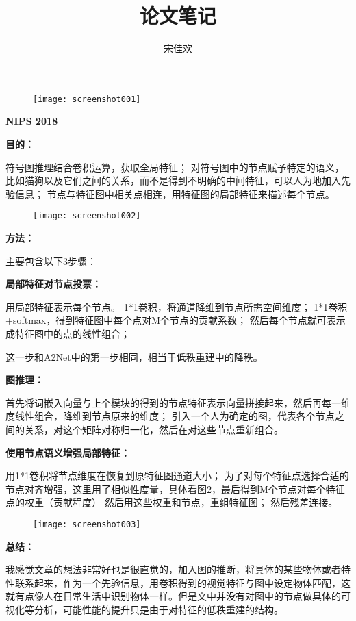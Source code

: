 \documentclass[UTF8]{ctexart} %
\title{论文笔记}
\author{宋佳欢}
\begin{document}
	
	\songti {}
	
	\begin{figure}[h]
	\centering
	\texttt{[image: screenshot001]}
	\label{fig:screenshot001}
	\end{figure}
	\textbf{NIPS 2018}
	
	\textbf{目的：}
	
	符号图推理结合卷积运算，获取全局特征；
	对符号图中的节点赋予特定的语义，比如猫狗以及它们之间的关系，而不是得到不明确的中间特征，可以人为地加入先验信息；
	节点与特征图中相关点相连，用特征图的局部特征来描述每个节点。
	\begin{figure}[H]
	\centering
	\texttt{[image: screenshot002]}
	\end{figure}

	\textbf{方法：}
	
	主要包含以下3步骤：
	
	\textbf{局部特征对节点投票：}
	
	用局部特征表示每个节点。
	1*1卷积，将通道降维到节点所需空间维度；
	1*1卷积+softmax，得到特征图中每个点对M个节点的贡献系数；
	然后每个节点就可表示成特征图中的点的线性组合；
	
	这一步和A2Net中的第一步相同，相当于低秩重建中的降秩。

	\textbf{图推理：}
	
	首先将词嵌入向量与上个模块的得到的节点特征表示向量拼接起来，然后再每一维度线性组合，降维到节点原来的维度；
	引入一个人为确定的图，代表各个节点之间的关系，对这个矩阵对称归一化，然后在对这些节点重新组合。
	
	\textbf{使用节点语义增强局部特征：}
	
	用1*1卷积将节点维度在恢复到原特征图通道大小；
	为了对每个特征点选择合适的节点对齐增强，这里用了相似性度量，具体看图2，最后得到M个节点对每个特征点的权重（贡献程度）
	然后用这些权重和节点，重组特征图；
	然后残差连接。
	
	\begin{figure}[H]
	\centering
	\texttt{[image: screenshot003]}
	\end{figure}
	
	
	\textbf{总结：}
	
		我感觉文章的想法非常好也是很直觉的，加入图的推断，将具体的某些物体或者特性联系起来，作为一个先验信息，用卷积得到的视觉特征与图中设定物体匹配，这就有点像人在日常生活中识别物体一样。但是文中并没有对图中的节点做具体的可视化等分析，可能性能的提升只是由于对特征的低秩重建的结构。
		
		
\end{document}
